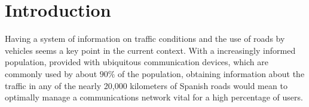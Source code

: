 \documentclass[preprint,authoryear,12pt]{elsarticle}
\begin{document}
\begin{frontmatter}



\title{}


\author[uja]{V.M. Rivas}
\author[ugr]{M.G. Arenas}
\author[ugr]{P.A. Castillo-Valdivieso}
\address[uja]{Department of Computer Sciences, University of Jaen (Spain)}
\address[ugr]{Department of Architecture and Computer Technology. CITIC. University of Granada (Spain)}


\address{}

\begin{abstract}

\end{abstract}

\begin{keyword}


\end{keyword}

\end{frontmatter}


\section{Introduction}
\label{sec:introduction}
Having a system of information on traffic conditions and the use of roads by vehicles seems a key point in the current context. 
With a increasingly informed population, provided with ubiquitous communication devices, which are commonly used by about $ 90 \% $ of the population, obtaining information about the traffic in any of the nearly 20,000 kilometers of Spanish roads would mean to optimally manage a communications network vital for a high percentage of users.
\end{document}
